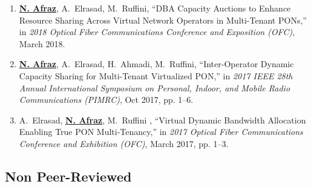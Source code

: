 \begin{enumerate}
    \item \textbf{\underline{N. {Afraz}}}, A.~{Elrasad}, M.~{Ruffini}, ``DBA Capacity Auctions to Enhance Resource Sharing Across Virtual Network Operators in Multi-Tenant PONs,'' in \emph{2018 Optical Fiber Communications Conference and Exposition (OFC)}, March 2018.
   
    \item \textbf{\underline{N. {Afraz}}}, A.~{Elrasad}, H.~Ahmadi,  M.~{Ruffini}, ``Inter-Operator Dynamic Capacity Sharing for Multi-Tenant Virtualized PON,'' in \emph{2017 IEEE 28th Annual International Symposium on Personal, Indoor, and Mobile Radio Communications (PIMRC)}, Oct 2017, pp. 1--6.

    \item A.~{Elrasad}, \textbf{\underline{N. {Afraz}}}, M.~{Ruffini} , ``Virtual Dynamic Bandwidth Allocation Enabling True PON Multi-Tenancy,'' in \emph{2017 Optical Fiber Communications Conference and Exhibition (OFC)}, March 2017, pp. 1--3.


 \end{enumerate}
 \subsection{Non Peer-Reviewed}

